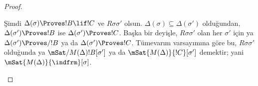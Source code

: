 \documentclass[../../../include/open-logic-section]{subfiles}
\begin{document}
\begin{proof}
\begin{enumerate}
{      Şimdi $\Delta(\sigma)\Proves !B\lif !C$ ve $R\sigma\sigma'$ olsun.
      $\Delta(\sigma)\subseteq\Delta(\sigma')$ olduğundan,
      $\Delta(\sigma')\Proves !B$ ise $\Delta(\sigma')\Proves !C$.
      Başka bir deyişle, $R\sigma\sigma'$ olan her $\sigma'$ için ya
      $\Delta(\sigma')\Proves/ !B$ ya da $\Delta(\sigma')\Proves !C$.
      Tümevarım varsayımına göre bu, $R\sigma\sigma'$ olduğunda ya
      $\mSat/{M(\Delta)}{!B}[\sigma']$ ya da
      $\mSat{M(\Delta)}{!C}[\sigma']$ demektir; yani
      $\mSat{M(\Delta)}{\indfrm}[\sigma]$.}
  \end{enumerate}
\end{proof}
\end{document}
